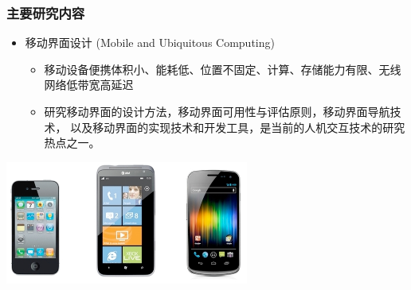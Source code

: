 \documentclass{beamer}
\begin{document}
\begin{frame}
	\frametitle{主要研究内容}
	\begin{itemize}
		\item 移动界面设计 (Mobile and Ubiquitous Computing)
		\begin{itemize}
			\item {\small 移动设备便携体积小、能耗低、位置不固定、计算、存储能力有限、无线网络低带宽高延迟}
			\item {\small 研究移动界面的设计方法，移动界面可用性与评估原则，移动界面导航技术，
				以及移动界面的实现技术和开发工具，是当前的人机交互技术的研究热点之一。}
		\end{itemize}
	\end{itemize}
	\begin{center}
		\includegraphics[width=8cm]{images/iOS-vs-WP7-vs-Android.png}
	\end{center}
\end{frame}
\end{document}

